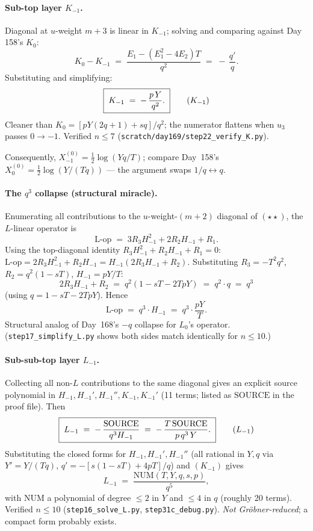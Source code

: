 \documentclass[11pt]{amsart}
\begin{document}
\paragraph{Sub-top layer $K_{-1}$.}
Diagonal at $u$-weight $m + 3$ is linear in $K_{-1}$; solving and comparing
against Day 158's $K_0$:
\[
K_0 - K_{-1} \;=\; \frac{E_1 - (E_1^2 - 4 E_2) T}{q^2} \;=\; -\,\frac{q'}{q}.
\]
Substituting and simplifying:
\begin{equation}
\boxed{\;K_{-1} \;=\; -\,\frac{p\,Y}{q^2}.\;} \tag{$K_{-1}$}
\end{equation}
Cleaner than $K_0 = [p Y (2 q + 1) + s q]/q^2$; the numerator flattens when
$u_3$ passes $0 \to -1$. Verified $n \le 7$
(\texttt{scratch/day169/step22\_verify\_K.py}).

Consequently, $X^{(0)}_{-1} = \tfrac{1}{2}\log(Y q / T)$; compare Day~158's
$X^{(0)}_0 = \tfrac{1}{2}\log(Y / (T q))$ --- the argument swaps
$1/q \leftrightarrow q$.

\paragraph{The $q^3$ collapse (structural miracle).}
Enumerating all contributions to the $u$-weight-$(m+2)$ diagonal of $(\star\star)$,
the $L$-linear operator is
\[
\text{L-op} \;=\; 3 R_3 H_{-1}^2 + 2 R_2 H_{-1} + R_1.
\]
Using the top-diagonal identity $R_3 H_{-1}^2 + R_2 H_{-1} + R_1 = 0$:
$\text{L-op} = 2 R_3 H_{-1}^2 + R_2 H_{-1} = H_{-1} (2 R_3 H_{-1} + R_2)$.
Substituting $R_3 = -T^2 q^2$, $R_2 = q^2(1 - s T)$, $H_{-1} = p Y / T$:
\[
2 R_3 H_{-1} + R_2 \;=\; q^2 (1 - s T - 2 T p Y) \;=\; q^2 \cdot q \;=\; q^3
\]
(using $q = 1 - s T - 2 T p Y$). Hence
\begin{equation}
\boxed{\;\text{L-op} \;=\; q^3 \cdot H_{-1} \;=\; q^3 \cdot \frac{p Y}{T}.\;} \tag{L-op}
\end{equation}
Structural analog of Day~168's $-q$ collapse for $L_0$'s operator.
(\texttt{step17\_simplify\_L.py} shows both sides match identically for $n \le 10$.)

\paragraph{Sub-sub-top layer $L_{-1}$.}
Collecting all non-$L$ contributions to the same diagonal gives an explicit
source polynomial in $H_{-1}, H_{-1}', H_{-1}'', K_{-1}, K_{-1}'$ (11 terms;
listed as $\mathrm{SOURCE}$ in the proof file). Then
\begin{equation}
\boxed{\;L_{-1} \;=\; -\,\frac{\mathrm{SOURCE}}{q^3 H_{-1}} \;=\; -\,\frac{T\,\mathrm{SOURCE}}{p\,q^3\,Y}.\;} \tag{$L_{-1}$}
\end{equation}
Substituting the closed forms for $H_{-1}, H_{-1}', H_{-1}''$ (all rational
in $Y, q$ via $Y' = Y/(Tq)$, $q' = -[s(1-sT) + 4pT]/q$) and $(K_{-1})$
gives
\[
L_{-1} \;=\; \frac{\mathrm{NUM}(T, Y, q, s, p)}{q^5},
\]
with $\mathrm{NUM}$ a polynomial of degree $\le 2$ in $Y$ and $\le 4$ in
$q$ (roughly 20 terms). Verified $n \le 10$
(\texttt{step16\_solve\_L.py}, \texttt{step31c\_debug.py}). \emph{Not
Gr\"obner-reduced}; a compact form probably exists.
\end{document}
